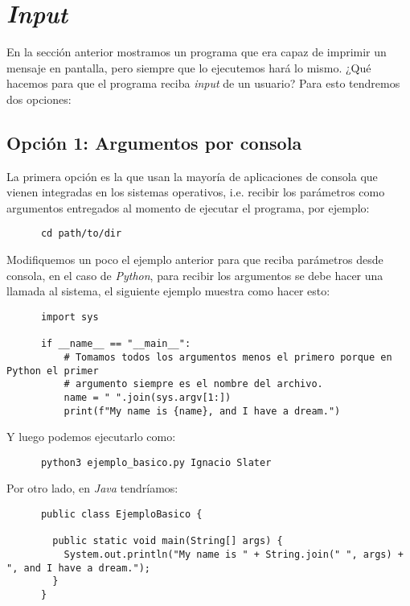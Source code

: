 \section{\textit{Input}}
  En la sección anterior mostramos un programa que era capaz de imprimir un mensaje en
  pantalla, pero siempre que lo ejecutemos hará lo mismo.
  ¿Qué hacemos para que el programa reciba \textit{input} de un usuario?
  Para esto tendremos dos opciones:

  \subsection{Opción 1: Argumentos por consola}
    La primera opción es la que usan la mayoría de aplicaciones de consola que vienen 
    integradas en los sistemas operativos, i.e. recibir los parámetros como argumentos
    entregados al momento de ejecutar el programa, por ejemplo:

    \begin{verbatim}
      cd path/to/dir
    \end{verbatim}

    Modifiquemos un poco el ejemplo anterior para que reciba parámetros desde consola,
    en el caso de \textit{Python}, para recibir los argumentos se debe hacer una llamada
    al sistema, el siguiente ejemplo muestra como hacer esto:

    \begin{verbatim}
      import sys

      if __name__ == "__main__":
          # Tomamos todos los argumentos menos el primero porque en Python el primer 
          # argumento siempre es el nombre del archivo.
          name = " ".join(sys.argv[1:])
          print(f"My name is {name}, and I have a dream.")
    \end{verbatim}

    Y luego podemos ejecutarlo como:

    \begin{verbatim}
      python3 ejemplo_basico.py Ignacio Slater
    \end{verbatim}

    Por otro lado, en \textit{Java} tendríamos:

    \begin{verbatim}
      public class EjemploBasico {

        public static void main(String[] args) {
          System.out.println("My name is " + String.join(" ", args) + ", and I have a dream.");
        }
      }
    \end{verbatim}

